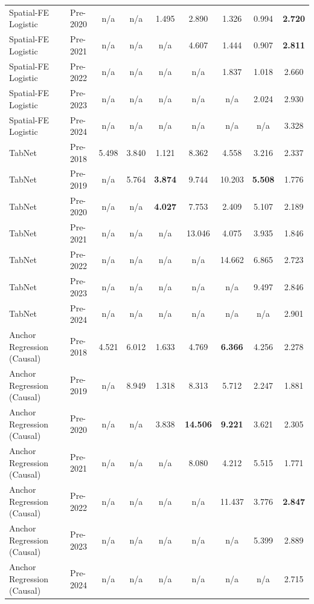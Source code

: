 \begin{table}[htbp]
{\begin{tabular}{l lccccccc}
Spatial-FE Logistic & Pre-2020 & n/a & n/a & 1.495 & 2.890 & 1.326 & 0.994 & \textbf{2.720} \\
Spatial-FE Logistic & Pre-2021 & n/a & n/a & n/a & 4.607 & 1.444 & 0.907 & \textbf{2.811} \\
Spatial-FE Logistic & Pre-2022 & n/a & n/a & n/a & n/a & 1.837 & 1.018 & 2.660 \\
Spatial-FE Logistic & Pre-2023 & n/a & n/a & n/a & n/a & n/a & 2.024 & 2.930 \\
Spatial-FE Logistic & Pre-2024 & n/a & n/a & n/a & n/a & n/a & n/a & 3.328 \\
TabNet & Pre-2018 & 5.498 & 3.840 & 1.121 & 8.362 & 4.558 & 3.216 & 2.337 \\
TabNet & Pre-2019 & n/a & 5.764 & \textbf{3.874} & 9.744 & 10.203 & \textbf{5.508} & 1.776 \\
TabNet & Pre-2020 & n/a & n/a & \textbf{4.027} & 7.753 & 2.409 & 5.107 & 2.189 \\
TabNet & Pre-2021 & n/a & n/a & n/a & 13.046 & 4.075 & 3.935 & 1.846 \\
TabNet & Pre-2022 & n/a & n/a & n/a & n/a & 14.662 & 6.865 & 2.723 \\
TabNet & Pre-2023 & n/a & n/a & n/a & n/a & n/a & 9.497 & 2.846 \\
TabNet & Pre-2024 & n/a & n/a & n/a & n/a & n/a & n/a & 2.901 \\
Anchor Regression (Causal) & Pre-2018 & 4.521 & 6.012 & 1.633 & 4.769 & \textbf{6.366} & 4.256 & 2.278 \\
Anchor Regression (Causal) & Pre-2019 & n/a & 8.949 & 1.318 & 8.313 & 5.712 & 2.247 & 1.881 \\
Anchor Regression (Causal) & Pre-2020 & n/a & n/a & 3.838 & \textbf{14.506} & \textbf{9.221} & 3.621 & 2.305 \\
Anchor Regression (Causal) & Pre-2021 & n/a & n/a & n/a & 8.080 & 4.212 & 5.515 & 1.771 \\
Anchor Regression (Causal) & Pre-2022 & n/a & n/a & n/a & n/a & 11.437 & 3.776 & \textbf{2.847} \\
Anchor Regression (Causal) & Pre-2023 & n/a & n/a & n/a & n/a & n/a & 5.399 & 2.889 \\
Anchor Regression (Causal) & Pre-2024 & n/a & n/a & n/a & n/a & n/a & n/a & 2.715 \\
\bottomrule
\end{tabular}%
}
\end{table}